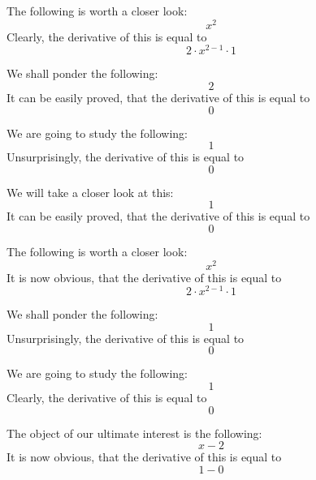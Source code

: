 \documentclass{article}
\begin{document}
The following is worth a closer look:
\begin{equation}
x ^{2 } 
\end{equation}
Clearly, the derivative of this is equal to
\begin{equation}
2 \cdot x ^{2 - 1 } \cdot 1 
\end{equation}

We shall ponder the following:
\begin{equation}
2 
\end{equation}
It can be easily proved, that the derivative of this is equal to
\begin{equation}
0 
\end{equation}

We are going to study the following:
\begin{equation}
1 
\end{equation}
Unsurprisingly, the derivative of this is equal to
\begin{equation}
0 
\end{equation}

We will take a closer look at this:
\begin{equation}
1 
\end{equation}
It can be easily proved, that the derivative of this is equal to
\begin{equation}
0 
\end{equation}

The following is worth a closer look:
\begin{equation}
x ^{2 } 
\end{equation}
It is now obvious, that the derivative of this is equal to
\begin{equation}
2 \cdot x ^{2 - 1 } \cdot 1 
\end{equation}

We shall ponder the following:
\begin{equation}
1 
\end{equation}
Unsurprisingly, the derivative of this is equal to
\begin{equation}
0 
\end{equation}

We are going to study the following:
\begin{equation}
1 
\end{equation}
Clearly, the derivative of this is equal to
\begin{equation}
0 
\end{equation}

The object of our ultimate interest is the following:
\begin{equation}
x - 2 
\end{equation}
It is now obvious, that the derivative of this is equal to
\begin{equation}
1 - 0 
\end{equation}
\end{document}
